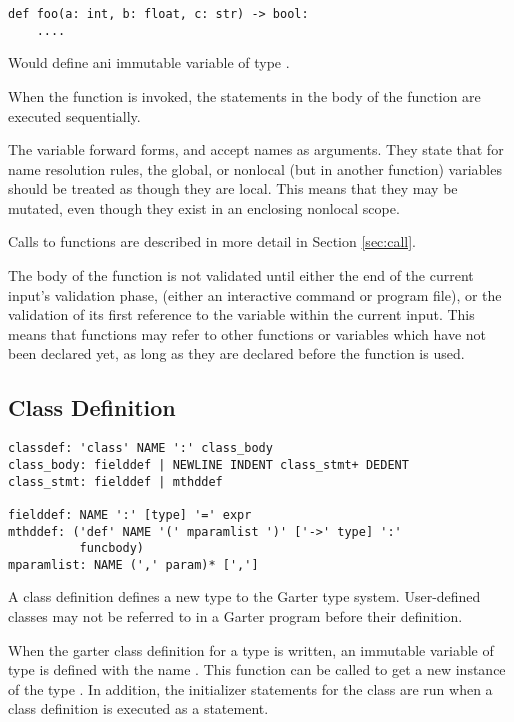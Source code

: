 \begin{lstlisting}
def foo(a: int, b: float, c: str) -> bool:
    ....
\end{lstlisting}

Would define ani immutable variable of type .

When the function is invoked, the statements in the body of the function are executed
sequentially.

The variable forward forms,  and  accept names as
arguments. They state that for name resolution rules, the global, or nonlocal (but in
another function) variables should be treated as though they are local. This means that
they may be mutated, even though they exist in an enclosing nonlocal scope.

Calls to functions are described in more detail in Section \ref{sec:call}.

The body of the function is not validated until either the end of the current
input's validation phase, (either an interactive command or program file), or
the validation of its first reference to the variable within the current input.
This means that functions may refer to other functions or variables which have
not been declared yet, as long as they are declared before the function is used.

\subsection{Class Definition}
\label{sec:classdef}

\begin{lstlisting}
classdef: 'class' NAME ':' class_body
class_body: fielddef | NEWLINE INDENT class_stmt+ DEDENT
class_stmt: fielddef | mthddef

fielddef: NAME ':' [type] '=' expr
mthddef: ('def' NAME '(' mparamlist ')' ['->' type] ':'
          funcbody)
mparamlist: NAME (',' param)* [',']
\end{lstlisting}

A class definition defines a new type to the Garter type system. User-defined
classes may not be referred to in a Garter program before their definition.

When the garter class definition for a type  is written, an immutable
variable of type  is defined with the name . This function can
be called to get a new instance of the type . In addition, the
initializer statements for the class are run when a class definition is executed
as a statement.

